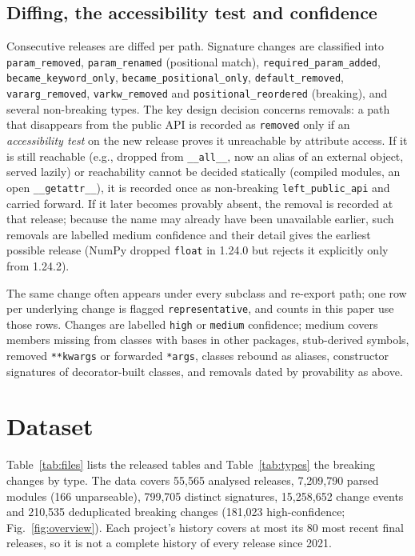 \documentclass[10pt,twocolumn,letterpaper]{article}
\begin{document}
\subsection{Diffing, the accessibility test and confidence}
Consecutive releases are diffed per path. Signature changes are classified into \texttt{param\_removed},
\texttt{param\_renamed} (positional match), \texttt{required\_param\_added}, \texttt{became\_keyword\_only},
\texttt{became\_positional\_only}, \texttt{default\_removed}, \texttt{vararg\_removed}, \texttt{varkw\_removed} and
\texttt{positional\_reordered} (breaking), and several non-breaking types. The key design decision concerns removals:
a path that disappears from the public API is recorded as \texttt{removed} only if an \emph{accessibility test} on
the new release proves it unreachable by attribute access. If it is still reachable (e.g., dropped from
\texttt{\_\_all\_\_}, now an alias of an external object, served lazily) or reachability cannot be decided statically
(compiled modules, an open \texttt{\_\_getattr\_\_}), it is recorded once as non-breaking \texttt{left\_public\_api} and
carried forward. If it later becomes provably absent, the removal is recorded at that release; because the name may
already have been unavailable earlier, such removals are labelled medium confidence and their detail gives the earliest
possible release (NumPy dropped \texttt{float} in 1.24.0 but rejects it explicitly only from 1.24.2).

The same change often appears under every subclass and re-export path; one row per underlying change is flagged
\texttt{representative}, and counts in this paper use those rows. Changes are labelled \texttt{high} or
\texttt{medium} confidence; medium covers members missing from classes with bases in other packages, stub-derived
symbols, removed \texttt{**kwargs} or forwarded \texttt{*args}, classes rebound as aliases, constructor signatures of
decorator-built classes, and removals dated by provability as above.

\section{Dataset}\label{sec:dataset}
Table~\ref{tab:files} lists the released tables and Table~\ref{tab:types} the breaking changes by type. The data covers
55,565 analysed releases, 7,209,790 parsed modules (166 unparseable), 799,705
distinct signatures, 15,258,652 change events and 210,535 deduplicated breaking changes
(181,023 high-confidence; Fig.~\ref{fig:overview}). Each project's history covers at most its 80 most recent final
releases, so it is not a complete history of every release since 2021.
\end{document}
